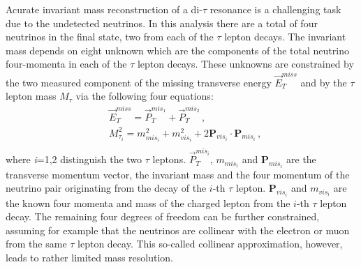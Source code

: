 Acurate invariant mass reconstruction of a di-$\tau$ resonance is a challenging task due to the undetected neutrinos. 
In this analysis there are a total of four neutrinos in the final state, two from  each 
of the $\tau$ lepton decays.
The invariant mass depends on eight unknown which are the components of the total neutrino four-momenta 
in each of the $\tau$ lepton decays. These unknowns are  constrained by the two measured component of the 
 missing transverse energy $\vec{E}_T^{miss}$ and by  the $\tau$ lepton mass $M_{\tau}$ via the following four equations:
% 
\begin{equation} \label{eq:MMC}
\begin{split}
&\vec{E}_T^{miss} = \vec{P}_{T}^{mis_{1}} +  \vec{P}_{T}^{mis_2} \,,\\
&M_{\tau_{i}}^2 = m^2_{mis_{i}} + m^2_{vis_{i}} + 2 \mathbf{P}_{vis_i} \cdot \mathbf{P}_{mis_i} \,, \\
\end{split}
\end{equation}
where \emph{i}=1,2 distinguish the two $\tau$ leptons.
$\vec{P}_{T}^{mis_{i}}$, $m_{mis_{i}}$ and $\mathbf{P}_{mis_{i}}$ are the transverse momentum vector, the invariant mass and 
the four momentum of the neutrino pair originating from the decay of the $i$-th  $\tau$ 
lepton. $\mathbf{P}_{vis_i}$ and $m_{vis_{i}}$ are the known four momenta and mass of the charged lepton from the $i$-th $\tau$ lepton decay.
The remaining four degrees of freedom can be 
further constrained, assuming for example that the neutrinos are collinear with the electron or muon from the same 
$\tau$ lepton decay. This so-called collinear approximation, however, leads to  rather limited  mass resolution.

